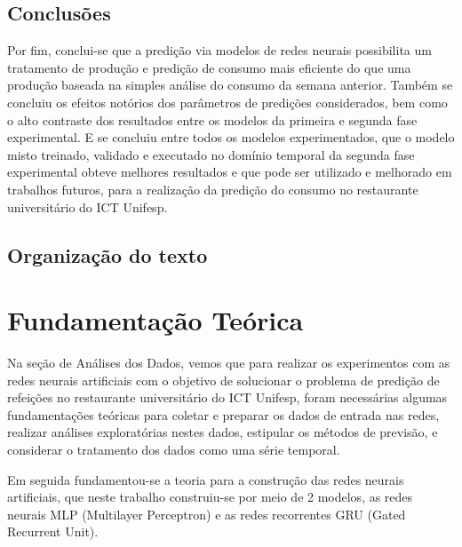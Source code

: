 \documentclass[	12pt, Times, openright, twoside, a4paper, english, brazil]{abntex2}
\begin{document}
        \section{Conclusões}
            Por fim, conclui-se que a predição via modelos de redes neurais possibilita um tratamento de produção e predição de consumo mais eficiente do que uma produção baseada na simples análise do consumo da semana anterior. 
            Também se concluiu os efeitos notórios dos parâmetros de predições considerados, bem como o alto contraste dos resultados entre os modelos da primeira e segunda fase experimental.
            E se concluiu entre todos os modelos experimentados, que o modelo misto treinado, validado e executado no domínio temporal da segunda fase experimental obteve melhores resultados e que pode ser utilizado e melhorado em trabalhos futuros, para a realização da predição do consumo no restaurante universitário do ICT Unifesp.
            
        \section{Organização do texto}
  \chapter{Fundamentação Teórica}
  
      Na seção de Análises dos Dados, vemos que para realizar os experimentos com as redes neurais artificiais com o objetivo de solucionar o problema de predição de refeições no restaurante universitário do ICT Unifesp, foram necessárias algumas fundamentações teóricas para coletar e preparar os dados de entrada nas redes, realizar análises exploratórias nestes dados, estipular os métodos de previsão, e considerar o tratamento dos dados como uma série temporal.
      
      Em seguida fundamentou-se a teoria para a construção das redes neurais artificiais, que neste trabalho construiu-se por meio de 2 modelos, as redes neurais MLP (Multilayer Perceptron) e as redes recorrentes GRU (Gated Recurrent Unit).
\end{document}
